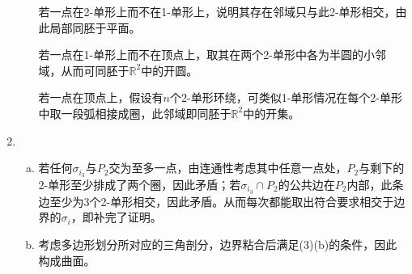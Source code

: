 \documentclass[a4paper,UTF8,fontset=windows]{ctexart}
\begin{document}
\begin{enumerate}[(1)]
\begin{enumerate}[(a)]
    若一点在2-单形上而不在1-单形上，说明其存在邻域只与此2-单形相交，由此局部同胚于平面。
    
    若一点在1-单形上而不在顶点上，取其在两个2-单形中各为半圆的小邻域，从而可同胚于$\mathbb{R}^2$中的开圆。
    
    若一点在顶点上，假设有$n$个2-单形环绕，可类似1-单形情况在每个2-单形中取一段弧相接成圈，此邻域即同胚于$\mathbb{R}^2$中的开集。
    \end{enumerate}
    
    \item
    \begin{enumerate}[(a)]
    \item
    若任何$\sigma_{i_3}$与$P_2$交为至多一点，由连通性考虑其中任意一点处，$P_2$与剩下的2-单形至少排成了两个圈，因此矛盾；若$\sigma_{i_3}\cap P_2$的公共边在$P_2$内部，此条边至少为3个2-单形相交，因此矛盾。从而每次都能取出符合要求相交于边界的$\sigma_i$，即补完了证明。
    
    \item
    考虑多边形划分所对应的三角剖分，边界粘合后满足(3)(b)的条件，因此构成曲面。
    \end{enumerate}
\end{enumerate}
\end{document}
